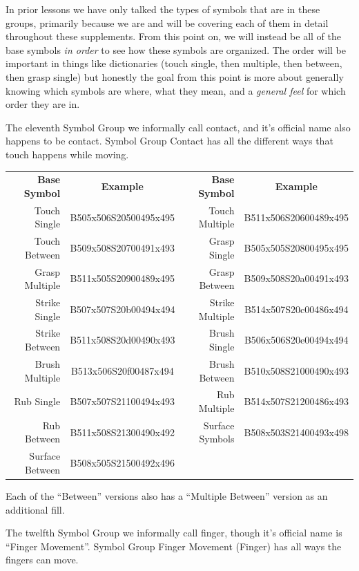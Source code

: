 \documentclass{article}
\begin{document}
In prior lessons we have only talked the types of symbols that are in these groups, primarily because we are and will be covering each of them in detail throughout these supplements.
From this point on, we will instead be all of the base symbols \emph{in order} to see how these symbols are organized.
The order will be important in things like dictionaries (touch single, then multiple, then between, then grasp single) but honestly the goal from this point is more about generally knowing which symbols are where, what they mean, and a \emph{general feel} for which order they are in.

The eleventh Symbol Group we informally call contact, and it's official name also happens to be contact.
Symbol Group Contact has all the different ways that touch happens while moving.

\begin{center}
\begin{tabular}{rcrc}
\textbf{Base Symbol}&\textbf{Example}&\textbf{Base Symbol}&\textbf{Example}\\
Touch Single   &B505x506S20500495x495&Touch Multiple &B511x506S20600489x495\\
Touch Between  &B509x508S20700491x493&Grasp Single   &B505x505S20800495x495\\
Grasp Multiple &B511x505S20900489x495&Grasp Between  &B509x508S20a00491x493\\
Strike Single  &B507x507S20b00494x494&Strike Multiple&B514x507S20c00486x494\\
Strike Between &B511x508S20d00490x493&Brush Single   &B506x506S20e00494x494\\
Brush Multiple &B513x506S20f00487x494&Brush Between  &B510x508S21000490x493\\
Rub Single     &B507x507S21100494x493&Rub Multiple   &B514x507S21200486x493\\
Rub Between    &B511x508S21300490x492&Surface Symbols&B508x503S21400493x498\\
Surface Between&B508x505S21500492x496\\
\end{tabular}
\end{center}

Each of the ``Between'' versions also has a ``Multiple Between'' version as an additional fill.

The twelfth Symbol Group we informally call finger, though it's official name is ``Finger Movement''.
Symbol Group Finger Movement (Finger) has all ways the fingers can move.
\end{document}
